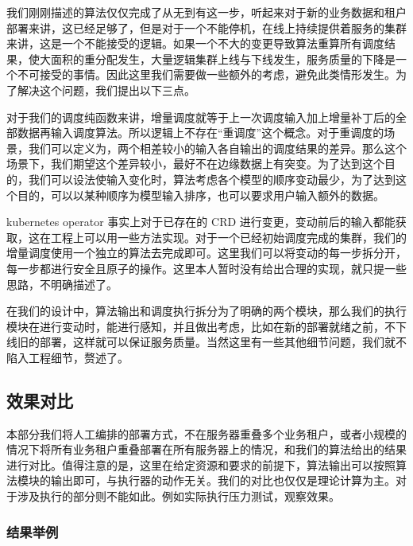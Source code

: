 
我们刚刚描述的算法仅仅完成了从无到有这一步，听起来对于新的业务数据和租户部署来讲，这已经足够了，但是对于一个不能停机，在线上持续提供着服务的集群来讲，这是一个不能接受的逻辑。如果一个不大的变更导致算法重算所有调度结果，使大面积的重分配发生，大量逻辑集群上线与下线发生，服务质量的下降是一个不可接受的事情。因此这里我们需要做一些额外的考虑，避免此类情形发生。为了解决这个问题，我们提出以下三点。


对于我们的调度纯函数来讲，增量调度就等于上一次调度输入加上增量补丁后的全部数据再输入调度算法。所以逻辑上不存在“重调度”这个概念。对于重调度的场景，我们可以定义为，两个相差较小的输入各自输出的调度结果的差异。那么这个场景下，我们期望这个差异较小，最好不在边缘数据上有突变。为了达到这个目的，我们可以设法使输入变化时，算法考虑各个模型的顺序变动最少，为了达到这个目的，可以以某种顺序为模型输入排序，也可以要求用户输入额外的数据。


kubernetes operator 事实上对于已存在的 CRD 进行变更，变动前后的输入都能获取，这在工程上可以用一些方法实现。对于一个已经初始调度完成的集群，我们的增量调度使用一个独立的算法去完成即可。这里我们可以将变动的每一步拆分开，每一步都进行安全且原子的操作。这里本人暂时没有给出合理的实现，就只提一些思路，不明确描述了。



在我们的设计中，算法输出和调度执行拆分为了明确的两个模块，那么我们的执行模块在进行变动时，能进行感知，并且做出考虑，比如在新的部署就绪之前，不下线旧的部署，这样就可以保证服务质量。当然这里有一些其他细节问题，我们就不陷入工程细节，赘述了。


\subsection{效果对比}

本部分我们将人工编排的部署方式，不在服务器重叠多个业务租户，或者小规模的情况下将所有业务租户重叠部署在所有服务器上的情况，和我们的算法给出的结果进行对比。值得注意的是，这里在给定资源和要求的前提下，算法输出可以按照算法模块的输出即可，与执行器的动作无关。我们的对比也仅仅是理论计算为主。对于涉及执行的部分则不能如此。例如实际执行压力测试，观察效果。

 \subsubsection{结果举例}

